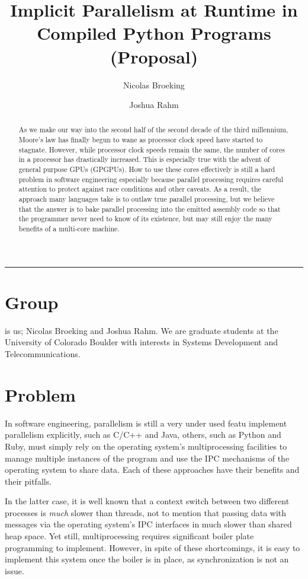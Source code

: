 \documentclass{article}
\title{Implicit Parallelism at Runtime in Compiled Python Programs\\
    (Proposal)}
\author{Nicolas Broeking \and Joshua Rahm}
\begin{document}
\nocite{*}
\maketitle
\hrule

\begin{multicols}{2}

\begin{abstract}

As we make our way into the second half of the second decade of the third
millennium, Moore's law has finally begun to wane as processor clock speed have
started to stagnate. However, while processor clock speeds remain the same, the
number of cores in a processor has drastically increased. This is especially
true with the advent of general purpose GPUs (GPGPUs). How to use these cores
effectively is still a hard problem in software engineering especially because
parallel processing requires careful attention to protect against race
conditions and other caveats.  As a result, the approach many languages take is
to outlaw true parallel processing, but we believe that the answer is to bake
parallel processing into the emitted assembly code so that the programmer never
need to know of its existence, but may still enjoy the many benefits of a
multi-core machine.

\end{abstract}

\section{Group}
\backslashx is us; Nicolas Broeking and
Joshua Rahm. We are graduate students at the University of Colorado
Boulder with interests in Systems Development and Telecommunications.

\section{Problem} In software engineering, parallelism is still a very under
used featu
implement parallelism explicitly, such as C/C++ and Java, others, such as
Python and Ruby, must simply rely on the operating system's multiprocessing
facilities to manage multiple instances of the program and use the IPC
mechanisms of the operating system to share data.  Each of these approaches
have their benefits and their pitfalls.

In the latter case, it is well known that a context switch between two
different processes is \emph{much} slower than threads, not to mention
that passing data with messages via the operating system's IPC
interfaces in much slower than shared heap space. Yet still,
multiprocessing requires significant boiler plate programming to
implement. However, in spite of these shortcomings, it is easy to
implement this system once the boiler is in place, as synchronization is
not an issue.


\end{multicols}
\end{document}

